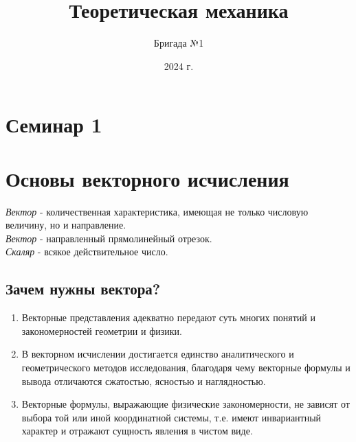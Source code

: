 \documentclass{article}
\title{Теоретическая механика}
\author{Бригада №1}
\date{2024 г.}
\begin{document}
\maketitle
\newpage
\tableofcontents

\newpage


\section{Семинар 1}

\section*{Основы векторного исчисления}
\textit{Вектор} - количественная характеристика, имеющая не только числовую величину, но и направление.\\
\textit{Вектор} - направленный прямолинейный отрезок.\\
\textit{Скаляр} - всякое действительное число.\\


\subsection*{Зачем нужны вектора?}
\begin{enumerate}
  \item Векторные представления адекватно передают суть многих понятий и закономерностей геометрии и физики. 
  \item В векторном исчислении достигается единство аналитического и геометрического методов исследования, благодаря чему векторные формулы и вывода отличаются сжатостью, ясностью и наглядностью.
  \item Векторные формулы, выражающие физические закономерности, не зависят от выбора той или иной координатной системы, т.е. имеют инвариантный характер и отражают сущность явления в чистом виде.
\end{enumerate}
\end{document}
